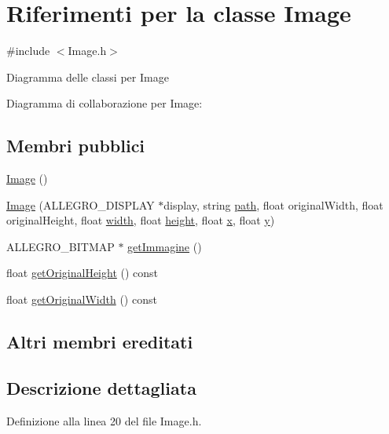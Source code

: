 \hypertarget{class_image}{}\section{Riferimenti per la classe Image}
\label{class_image}


{\ttfamily \#include $<$Image.\+h$>$}



Diagramma delle classi per Image


Diagramma di collaborazione per Image\+:
\subsection*{Membri pubblici}
\begin{DoxyCompactItemize}
\item 
\hyperlink{class_image_a58edd1c45b4faeb5f789b0d036d02313}{Image} ()
\item 
\hyperlink{class_image_a62706728207cc288e7dd9388aaa6d3ed}{Image} (A\+L\+L\+E\+G\+R\+O\+\_\+\+D\+I\+S\+P\+L\+AY $\ast$display, string \hyperlink{class_sprite_a8f128f4a40eb996f611c64c7d41b1584}{path}, float original\+Width, float original\+Height, float \hyperlink{class_game_object_af797cec05ff1d3cbc694fc7036add37b}{width}, float \hyperlink{class_game_object_a0ae9c255f47b6148c26d0333a72d0625}{height}, float \hyperlink{class_game_object_ad4976cd29785cf9bd791148ff397c41e}{x}, float \hyperlink{class_game_object_a9ac54f1c686ecf5656139a829ed62041}{y})
\item 
A\+L\+L\+E\+G\+R\+O\+\_\+\+B\+I\+T\+M\+AP $\ast$ \hyperlink{class_image_a07f53736dd232f43440086afdd65819b}{get\+Immagine} ()
\item 
float \hyperlink{class_image_afff3dfe926bcd0577a306a77b6cfe2a7}{get\+Original\+Height} () const
\item 
float \hyperlink{class_image_a89a84a3ca7f9f116b2e48f78d1f05122}{get\+Original\+Width} () const
\end{DoxyCompactItemize}
\subsection*{Altri membri ereditati}


\subsection{Descrizione dettagliata}


Definizione alla linea 20 del file Image.\+h.



